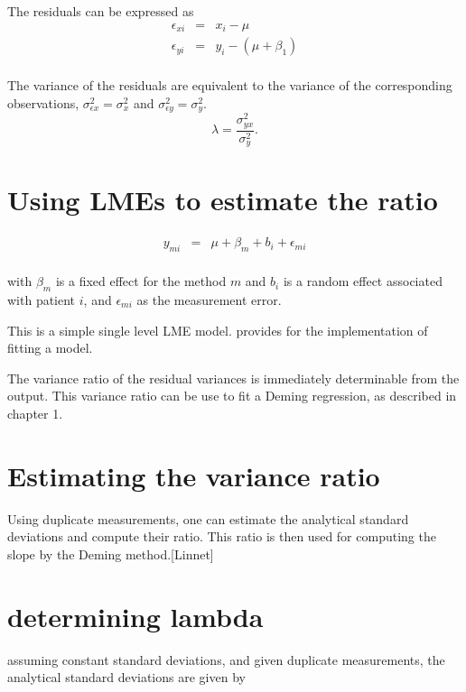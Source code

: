 \documentclass[12pt, a4paper]{report}
\theoremstyle{plain}
\theoremstyle{definition}
\theoremstyle{remark}
\begin{document}
The residuals can be expressed as
\begin{eqnarray*}
	\epsilon_{xi} &=& x_{i} - \mu  \\
	\epsilon_{yi} &=& y_{i} - (\mu + \beta_{1}) \\
\end{eqnarray*}

The variance of the residuals are equivalent to the variance of
the corresponding observations, $\sigma^{2}_{\epsilon x} =
\sigma^{2}_{x}$ and $\sigma^{2}_{\epsilon y} = \sigma^{2}_{y}$.
\begin{equation}
	\lambda = \frac{\sigma^{2}_{yx}}{\sigma^{2}_{y}}.
\end{equation}


\section{Using LMEs to estimate the ratio}

\begin{eqnarray*}
	y_{mi} &=& \mu + \beta_{m} + b_{i} + \epsilon_{mi}\\
\end{eqnarray*}

with $\beta_{m}$ is a fixed effect for the method $m$ and $b_{i}$
is a random effect associated with patient $i$, and
$\epsilon_{mi}$ as the measurement error.

This is a simple single level LME model. \citet{pb} provides for
the implementation of fitting a model.

The variance ratio of the residual variances is immediately
determinable from the output. This variance ratio can be use to
fit a Deming regression, as described in chapter 1.



\section{Estimating the variance ratio}

Using duplicate measurements, one can estimate the analytical
standard deviations and compute their ratio. This ratio is then
used for computing the slope by the Deming method.[Linnet]

\section{determining lambda}
assuming constant standard deviations, and given duplicate
measurements, the analytical standard deviations are given by
\end{document}
